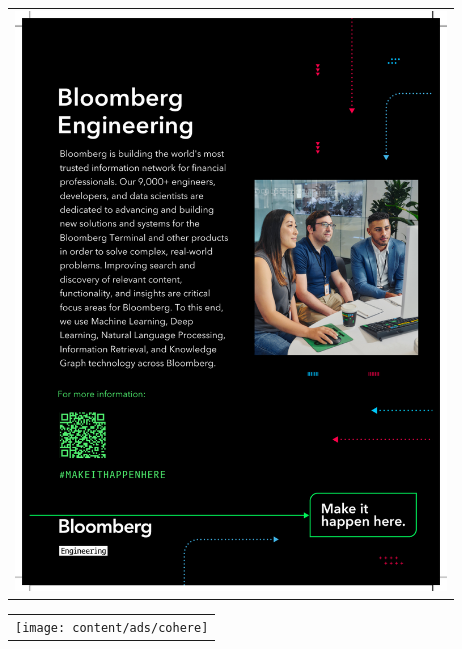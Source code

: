 \begin{center}\begin{tabular}{c}
  \includegraphics[width=4.5in]{content/ads/bloomberg_full} \\
\end{tabular}\end{center}
\begin{center}\begin{tabular}{c}
  \texttt{[image: content/ads/cohere]} \\
\end{tabular}\end{center}
